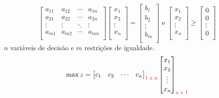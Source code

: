 \documentclass{beamer}
\begin{document}
\begin{frame}
\begin{mdframed}[backgroundcolor=blue!20]
{\begin{equation*}
				\begin{bmatrix}
						a_{11} & a_{12} & \cdots & a_{1n} \\
						a_{21} & a_{22} & \cdots & a_{2n} \\
						\vdots & \vdots & \ddots & \vdots \\
						a_{m1} & a_{m2} & \cdots & a_{mn} \\
				\end{bmatrix}
				\begin{bmatrix}
						x_1 \\
						x_2 \\
						\vdots \\
						x_n \\
				\end{bmatrix} = 
				\begin{bmatrix}
						b_1 \\
						b_2 \\
						\vdots \\
						b_m \\
				\end{bmatrix} \text{ e }
				\begin{bmatrix}
						x_1 \\
						x_2 \\
						\vdots \\
						x_n \\
				\end{bmatrix} \ge
				\begin{bmatrix}
						0 \\
						0 \\
						\vdots \\
						0 \\
				\end{bmatrix} 				
			\end{equation*}			
			$n$ variáveis de decisão e $m$ restrições de igualdade.
		}
		\only<4>
		{
			\begin{equation*} 
				\max z = \begin{bmatrix}
							c_1 & c_2 & \cdots & c_n \\
						 \end{bmatrix}_{\text{\color{red}1 x n}}
						 \begin{bmatrix}
							 x_1 \\
							 x_2 \\
							 \vdots \\
							 x_n \\
						 \end{bmatrix}_{\text{\color{red}n x 1}} 

\end{equation*}}
\end{mdframed}
\end{frame}
\end{document}
